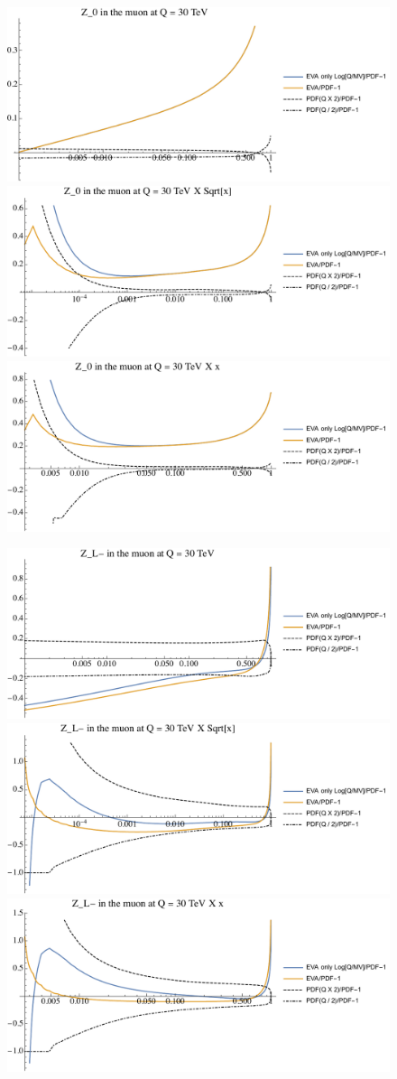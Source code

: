 \documentclass[a4paper,11pt]{article}
\begin{document}
\begin{figure}[ht]
\includegraphics[width=0.46\linewidth]{PlotPDFs/ratios/30TeV/Z_0_Q.pdf}
\includegraphics[width=0.46\linewidth]{PlotPDFs/ratios/30TeV/Z_0_Qsqrtx.pdf}
\includegraphics[width=0.46\linewidth]{PlotPDFs/ratios/30TeV/Z_0_Qx.pdf}
\end{figure}

\begin{figure}[ht]
\includegraphics[width=0.46\linewidth]{PlotPDFs/ratios/30TeV/Z_L-_Q.pdf}
\includegraphics[width=0.46\linewidth]{PlotPDFs/ratios/30TeV/Z_L-_Qsqrtx.pdf}
\includegraphics[width=0.46\linewidth]{PlotPDFs/ratios/30TeV/Z_L-_Qx.pdf}
\end{figure}
\end{document}
